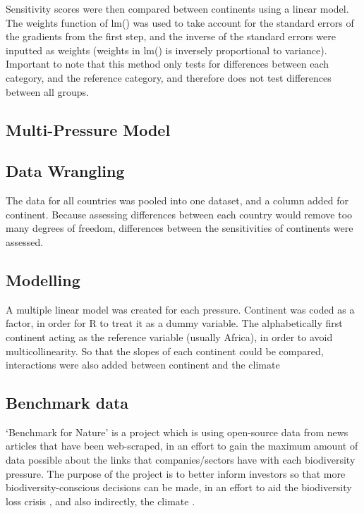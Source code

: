 \documentclass[11pt, a4paper, titlepage]{article}
\begin{document}
	Sensitivity scores were then compared between continents using a linear model. The weights function of lm() was used to take account for the standard errors of the gradients from the first step, and the inverse of the standard errors were inputted as weights (weights in lm() is inversely proportional to variance). Important to note that this method only tests for differences between each category, and the reference category, and therefore does not test differences between all groups.  \newline
	
	
	\subsection*{Multi-Pressure Model}
		
	\subsection*{Data Wrangling}
	The data for all countries was pooled into one dataset, and a column added for continent. Because assessing differences between each country would remove too many degrees of freedom, differences between the sensitivities of continents were assessed.
	 
	\subsection*{Modelling}
	
	A multiple linear model was created for each pressure. Continent was coded as a factor, in order for R to treat it as a dummy variable. The alphabetically first continent acting as the reference variable (usually Africa), in order to avoid multicollinearity. So that the slopes of each continent could be compared, interactions were also added between continent and the climate \newline


	

	
	
	\subsection*{Benchmark data}
		
	`Benchmark for Nature' is a project which is using open-source data from news articles that have been web-scraped, in an effort to gain the maximum amount of data possible about the links that companies/sectors have with each biodiversity pressure.
	The purpose of the project is to better inform investors so that more biodiversity-conscious decisions can be made, in an effort to aid the biodiversity loss crisis \citep{gasu2021review}, and also indirectly, the climate \citep{shin2022actions}.
	
\end{document}
